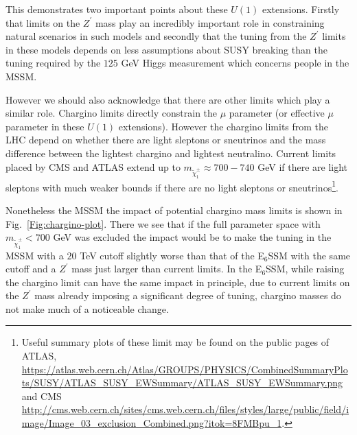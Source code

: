 \documentclass[preprint,amsmath,amssymb,aps,superscriptaddress,prd,showpacs,floatfix,nofootinbib]{revtex4-1}
\begin{document}
This demonstrates two important points about these $U(1)$
extensions. Firstly that limits on the $Z^\prime$ mass play an
incredibly important role in constraining natural scenarios in such
models and secondly that the tuning from the $Z^\prime$ limits in
these models depends on less assumptions about SUSY breaking than the
tuning required by the $125$ GeV Higgs measurement which concerns
people in the MSSM.

However we should also acknowledge that there are other limits which
play a similar role.  Chargino limits directly constrain the $\mu$
parameter (or effective $\mu$ parameter in these $U(1)$ extensions).
However the chargino limits from the LHC depend on whether there are
light sleptons or sneutrinos and the mass difference between the
lightest chargino and lightest neutralino.  Current limits placed by
CMS and ATLAS extend up to $m_{\tilde{\chi}^\pm_1} \approx 700-740$ GeV if
there are light sleptons\cite{Khachatryan:2014qwa,Aad:2014nua} with
much weaker bounds if there are no light sleptons or
sneutrinos\footnote{Useful summary plots of these limit may be found
  on the public pages of ATLAS,
  \url{https://atlas.web.cern.ch/Atlas/GROUPS/PHYSICS/CombinedSummaryPlots/SUSY/ATLAS_SUSY_EWSummary/ATLAS_SUSY_EWSummary.png}
  and CMS
  \url{http://cms.web.cern.ch/sites/cms.web.cern.ch/files/styles/large/public/field/image/Image_03_exclusion_Combined.png?itok=8FMBpu_1}.}.




Nonetheless the MSSM the impact of potential chargino mass limits is
shown in Fig.~\ref{Fig:chargino-plot}.  There we see that if the 
full parameter space with $m_{\tilde{\chi}^\pm_1} < 700$ GeV was excluded the
impact would be to make the tuning in the MSSM with a $20$ TeV cutoff
slightly worse than that of the E$_6$SSM with the same cutoff and a
$Z^\prime$ mass just larger than current limits. In the E$_6$SSM,
while raising the chargino limit can have the same impact in
principle, due to current limits on the $Z^\prime$ mass already
imposing a significant degree of tuning, chargino masses do not make
much of a noticeable change.
\end{document}
